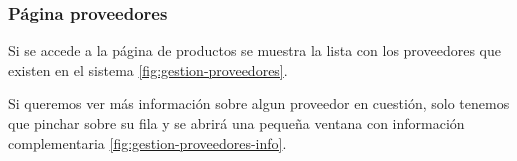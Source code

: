 
\subsubsection{Página proveedores}

Si se accede a la página de productos se muestra la lista con los proveedores que existen en el sistema \ref{fig:gestion-proveedores}.


Si queremos ver más información sobre algun proveedor en cuestión, solo tenemos que pinchar sobre su fila y se abrirá una pequeña ventana con información complementaria \ref{fig:gestion-proveedores-info}.

